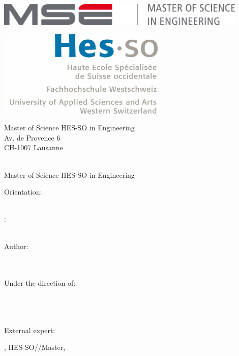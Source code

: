\begin{titlepage}
{\selectfont
	\begin{flushright}
		\begin{minipage}{0.5\textwidth}
			\begin{flushleft}
				\includegraphics[width=0.9\textwidth]{99-imgs/logo_mse}
			\end{flushleft}
		\end{minipage}%
		\begin{minipage}{0.5\textwidth}
			\begin{flushright}
				\includegraphics[width=0.6\textwidth]{99-imgs/logo_hesso}
			\end{flushright}
		\end{minipage}
		\begin{flushleft}\scriptsize
		Master of Science HES-SO in Engineering \\
		Av. de Provence 6 \\
		CH-1007 Lausanne
		\end{flushleft}
		
		~\\[0.5cm]
		
		{\Huge Master of Science HES-SO in Engineering\\[0.5cm]}
		
		{\LARGE Orientation: \Orientation\\[0.5cm] ~\\[1cm]}
		
		{\LARGE \ThesisType: \Huge \ThesisTitle \\}
		{\large \ThesisSubject \\[1.5cm]}
		
		{
		\large Author:\\
		\Huge \Author \\ %
		\large \texttt{\AuthorEmail} \\[1cm]
		}
		
		{
		\large Under the direction of: \\ 
		\Supervisor \\
		\SupervisorSchool \\
		\SupervisorResearchUnit \\[0.5cm]
		}
		
		{
		\large External expert: \\
		\Expert
		}
		
		\vfill
		
		{\large \Locality, HES-SO//Master, \Date}
		
	\end{flushright}		
}
\end{titlepage}